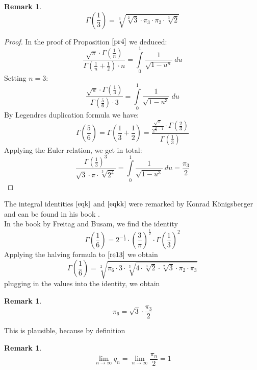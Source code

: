 \documentclass[sn-mathphys]{sn-jnl}%
\theoremstyle{thmstyleone}%
\theoremstyle{thmstyletwo}%
\newtheorem{remark}[theorem]{Remark}%
\theoremstyle{thmstylethree}%
\begin{document}
\begin{remark}\label{re13}
\begin{equation}
\Gamma(\frac{1}{3}) = \sqrt[3]{\sqrt[2]{3} \cdot \pi_{3} \cdot \pi_{2} \cdot \sqrt[3]{2}}
\end{equation}
\end{remark}
\begin{proof}
In the proof of Proposition $\ref{pr4}$ we deduced: 
\begin{equation}\label{eqkk}
\frac{\sqrt{\pi} \cdot \Gamma(\frac{1}{n})}{\Gamma(\frac{1}{n} + \frac{1}{2}) \cdot n} = \int \limits_{0}^{1} \frac{1}{\sqrt{1 - u^{n}}} \ du
\end{equation}
Setting $n=3$: 
\begin{equation*}
\frac{\sqrt{\pi} \cdot \Gamma(\frac{1}{3})}{\Gamma(\frac{5}{6}) \cdot 3} = \int \limits_{0}^{1} \frac{1}{\sqrt{1 - u^{3}}} \ du
\end{equation*}
By Legendres duplication formula we have:
\begin{equation*}
\Gamma(\frac{5}{6}) = \Gamma(\frac{1}{3} + \frac{1}{2}) = \frac{\frac{\sqrt{\pi}}{2^{\frac{2}{3} - 1}} \cdot \Gamma(\frac{2}{3})}{\Gamma(\frac{1}{3})}
\end{equation*}
Applying the Euler relation, we get in total: 
\begin{equation}\label{eqk}
\frac{\Gamma(\frac{1}{3})^3}{\sqrt{3} \cdot \pi \cdot \sqrt[3]{2^4}} = \int \limits_{0}^{1} \frac{1}{\sqrt{1 - u^{3}}} \ du = \frac{\pi_3}{2}
\end{equation}
\end{proof}
The integral identities $\ref{eqk}$ and $\ref{eqkk}$ were remarked by Konrad Königsberger and can be found in his book \cite{koenigsberger}. \\
In the book \cite{freitag} by Freitag and Busam, we find the identity 
\begin{equation}
\Gamma(\frac{1}{6}) = 2^{- \frac{1}{3}} \cdot (\frac{3}{\pi})^{\frac{1}{2}} \cdot \Gamma(\frac{1}{3})^2
\end{equation}
Applying the halving formula to $\ref{re13}$ we obtain
\begin{equation}
\Gamma(\frac{1}{6}) = \sqrt[2]{\pi_6 \cdot 3 \cdot \sqrt[3]{4 \cdot \sqrt[3]{2} \cdot \sqrt[2]{3} \cdot \pi_2 \cdot \pi_3}}
\end{equation}
plugging in the values into the identity, we obtain
\begin{remark}\label{re14}
\begin{equation}
\pi_6 = \sqrt{3} \cdot \frac{\pi_3}{2}
\end{equation}
\end{remark}
This is plausible, because by definition
\begin{remark}\label{re15}
\begin{equation}
\lim_{n \to \infty}  q_n = \lim_{n \to \infty} \frac{\pi_n}{2} = 1
\end{equation}
\end{remark}
\end{document}
